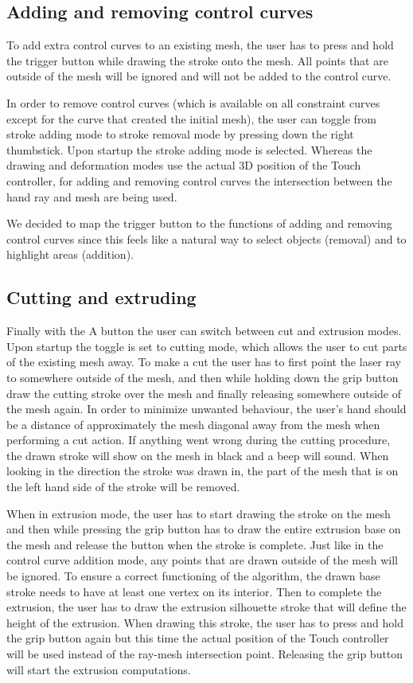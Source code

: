 \subsection{Adding and removing control curves}
To add extra control curves to an existing mesh, the user has to press and hold the trigger button while drawing the stroke onto the mesh. All points that are outside of the mesh will be ignored and will not be added to the control curve. 

In order to remove control curves (which is available on all constraint curves except for the curve that created the initial mesh), the user can toggle from stroke adding mode to stroke removal mode by pressing down the right thumbstick. Upon startup the stroke adding mode is selected. Whereas the drawing and deformation modes use the actual 3D position of the Touch controller, for adding and removing control curves the intersection between the hand ray and mesh are being used. 

We decided to map the trigger button to the functions of adding and removing control curves since this feels like a natural way to select objects (removal) and to highlight areas (addition).

\subsection{Cutting and extruding}
Finally with the A button the user can switch between cut and extrusion modes. Upon startup the toggle is set to cutting mode, which allows the user to cut parts of the existing mesh away. To make a cut the user has to first point the laser ray to somewhere outside of the mesh, and then while holding down the grip button draw the cutting stroke over the mesh and finally releasing somewhere outside of the mesh again. In order to minimize unwanted behaviour, the user's hand should be a distance of approximately the mesh diagonal away from the mesh when performing a cut action. If anything went wrong during the cutting procedure, the drawn stroke will show on the mesh in black and a beep will sound. When looking in the direction the stroke was drawn in, the part of the mesh that is on the left hand side of the stroke will be removed.

When in extrusion mode, the user has to start drawing the stroke on the mesh and then while pressing the grip button has to draw the entire extrusion base on the mesh and release the button when the stroke is complete. Just like in the control curve addition mode, any points that are drawn outside of the mesh will be ignored. To ensure a correct functioning of the algorithm, the drawn base stroke needs to have at least one vertex on its interior. Then to complete the extrusion, the user has to draw the extrusion silhouette stroke that will define the height of the extrusion. When drawing this stroke, the user has to press and hold the grip button again but this time the actual position of the Touch controller will be used instead of the ray-mesh intersection point. Releasing the grip button will start the extrusion computations.

